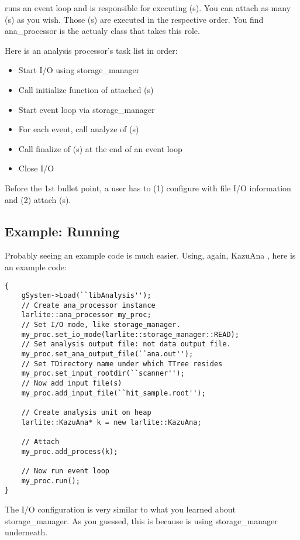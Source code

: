 
\anaproc runs an event loop and is responsible for executing \anaunit(s). You can attach as many \anaunit(s) as you wish. Those \anaunit(s) are executed in the respective order. You find {\ttfamily ana\_processor} is the actualy \CPP class that takes this role.

Here is an analysis processor's task list in order:
\begin{itemize}
\item Start I/O using {\ttfamily storage\_manager}
\item Call {\ttfamily initialize} function of attached \anaunit(s)
\item Start event loop via {\ttfamily storage\_manager}
\item For each event, call {\ttfamily analyze} of \anaunit(s)
\item Call {\ttfamily finalize} of \anaunit(s) at the end of an event loop
\item Close I/O
\end{itemize}
Before the 1st bullet point, a user has to (1) configure \anaproc with file I/O information and (2) attach \anaunit(s).

\subsection{Example: Running \anaproc}
Probably seeing an example code is much easier. Using, again, {\ttfamily KazuAna} \anaunit, here is an example \CINT code:
\begin{lstlisting}
{
    gSystem->Load(``libAnalysis'');
    // Create ana_processor instance
    larlite::ana_processor my_proc;
    // Set I/O mode, like storage_manager.
    my_proc.set_io_mode(larlite::storage_manager::READ);
    // Set analysis output file: not data output file.
    my_proc.set_ana_output_file(``ana.out'');
    // Set TDirectory name under which TTree resides
    my_proc.set_input_rootdir(``scanner'');
    // Now add input file(s)
    my_proc.add_input_file(``hit_sample.root'');
    
    // Create analysis unit on heap
    larlite::KazuAna* k = new larlite::KazuAna;
    
    // Attach
    my_proc.add_process(k);

    // Now run event loop
    my_proc.run();
}
\end{lstlisting}
The I/O configuration is very similar to what you learned about {\ttfamily storage\_manager}. As you guessed, this is because \anaproc is using {\ttfamily storage\_manager} underneath.

